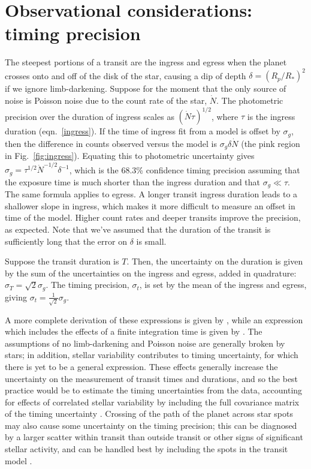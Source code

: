 \documentclass[graybox,natbib,nosecnum]{svmult}
\begin{document}
\section{Observational considerations: timing precision} %

The steepest portions of a transit are the ingress and egress when the planet crosses onto and
off of the disk of the star, causing a dip of depth $\delta = (R_p/R_*)^2$ if we ignore limb-darkening.   
Suppose for the moment that the only source of noise is Poisson noise due to the count rate of 
the star, $\dot N$.  The photometric precision over the duration of ingress scales as
$(\dot N \tau)^{1/2}$, where $\tau$ is the ingress duration (eqn.\ \ref{ingress}).  If the time of 
ingress fit from a model is offset by $\sigma_g$, then the difference in counts observed
versus the model is $\sigma_g \delta \dot N$ (the pink region in Fig.\ \ref{fig:ingress}).  Equating 
this to photometric uncertainty gives $\sigma_g = \tau^{1/2} \dot N^{-1/2} \delta^{-1}$, which
is the 68.3\% confidence timing precision assuming that the exposure time is much shorter than the
ingress duration and that $\sigma_g \ll \tau$.  The same formula applies to egress. A longer transit 
ingress duration leads to a shallower slope in ingress, which makes it more difficult to measure an 
offset in time of the model.  Higher count rates and deeper transits improve the precision, as 
expected.  Note that we've assumed that the duration of the transit is sufficiently long that the 
error on $\delta$ is small.

Suppose the transit duration is $T$.  Then, the uncertainty on the duration is given by
the sum of the uncertainties on the ingress and egress, added in quadrature:
$\sigma_T = \sqrt{2} \sigma_g$.  The timing precision, $\sigma_t$, is set by the mean of the ingress
and egress, giving $\sigma_t = \frac{1}{\sqrt{2}} \sigma_g$.

A more complete derivation of these expressions is given by \citet{2008ApJ...689..499C}, while an 
expression which includes the effects of a finite integration time is given by \citet{2014ApJ...794...92P}.
The assumptions of no limb-darkening and Poisson noise are generally broken by stars;  in addition,
stellar variability contributes to timing uncertainty, for which there is yet to be a general
expression.  These effects generally increase the uncertainty on the measurement of transit times
and durations, and so the best practice would be to estimate the timing uncertainties from the
data, accounting for effects of correlated stellar variability by including the full covariance
matrix of the timing uncertainty \citep{2009ApJ...704...51C,2012MNRAS.419.2683G}.  Crossing of
the path of the planet across star spots may also cause some uncertainty on the timing precision;
this can be diagnosed by a larger scatter within transit than outside transit or other signs of
significant stellar activity, and can be handled best by including the spots in the transit model 
\citep{2016A&A...585A..72I}.
\end{document}
